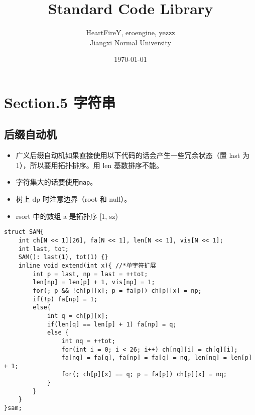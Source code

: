 \documentclass[]{article}
\date{}
\title{\vspace{50mm} \huge Standard Code Library \\[20pt]}
\author{HeartFireY, eroengine, yezzz \\[10pt] Jiangxi Normal University}
\date{\today}
\providecommand{\tightlist}{%
  \setlength{\itemsep}{0pt}\setlength{\parskip}{0pt}}
\begin{document}
\begin{titlepage}

\maketitle

\end{titlepage}

\newpage

\renewcommand\labelitemi{$\bullet$}

{
\setcounter{tocdepth}{3}
\tableofcontents
\newpage
}








\hypertarget{section.5-ux5b57ux7b26ux4e32}{%
\section{Section.5 字符串}\label{section.5-ux5b57ux7b26ux4e32}}

\hypertarget{ux540eux7f00ux81eaux52a8ux673a}{%
\subsection{后缀自动机}\label{ux540eux7f00ux81eaux52a8ux673a}}

\begin{itemize}
\tightlist
\item
  广义后缀自动机如果直接使用以下代码的话会产生一些冗余状态（置 last 为
  1），所以要用拓扑排序。用 len 基数排序不能。
\item
  字符集大的话要使用\texttt{map}。
\item
  树上 dp 时注意边界（root 和 null）。
\item
  rsort 中的数组 a 是拓扑序 {[}1, sz)
\end{itemize}

\begin{verbatim}
struct SAM{
    int ch[N << 1][26], fa[N << 1], len[N << 1], vis[N << 1];
    int last, tot;
    SAM(): last(1), tot(1) {}
    inline void extend(int x){ //*单字符扩展
        int p = last, np = last = ++tot;
        len[np] = len[p] + 1, vis[np] = 1;
        for(; p && !ch[p][x]; p = fa[p]) ch[p][x] = np;
        if(!p) fa[np] = 1;
        else{
            int q = ch[p][x];
            if(len[q] == len[p] + 1) fa[np] = q;
            else {
                int nq = ++tot;
                for(int i = 0; i < 26; i++) ch[nq][i] = ch[q][i];
                fa[nq] = fa[q], fa[np] = fa[q] = nq, len[nq] = len[p] + 1;
                for(; ch[p][x] == q; p = fa[p]) ch[p][x] = nq;
            }
        }
    }
}sam;
\end{verbatim}
\end{document}
